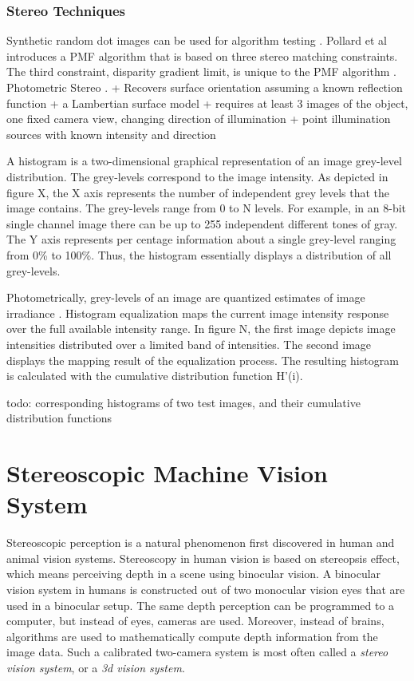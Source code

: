 \documentclass[12pt,a4paper,oneside,pdftex]{report}
\begin{document}
{\subsection{Stereo Techniques}


Synthetic random dot images can be used for algorithm testing \cite{Zitnick00}.
Pollard et al introduces a PMF algorithm that is based on three stereo matching constraints. The third constraint, disparity gradient limit, is unique to the PMF algorithm \cite{Sonka07}.
Photometric Stereo \cite{Woodham80}.
    + Recovers surface orientation assuming a known reflection function
    + a Lambertian surface model
    + requires at least 3 images of the object, one fixed camera view, changing direction of illumination
    + point illumination sources with known intensity and direction



A histogram is a two-dimensional graphical representation of an image grey-level distribution. The grey-levels correspond to the image intensity. As depicted in figure X, the X axis represents the number of independent grey levels that the image contains. The grey-levels range from 0 to N levels. For example, in an 8-bit single channel image there can be up to 255 independent different tones of gray. The Y axis represents per centage information about a single grey-level ranging from 0\% to 100\%. Thus, the histogram essentially displays a distribution of all grey-levels.

Photometrically, grey-levels of an image are quantized estimates of image irradiance \cite{Sonka07}.
Histogram equalization maps the current image intensity response over the full available intensity range. In figure N, the first image depicts image intensities distributed over a limited band of intensities. The second image displays the mapping result of the equalization process. The resulting histogram is calculated with the cumulative distribution function H'(i).

todo: corresponding histograms of two test images, and their cumulative distribution functions

\chapter{Stereoscopic Machine Vision System}
\label{chapter:stereographic_machine_vision_system}
Stereoscopic perception is a natural phenomenon first discovered in human and animal vision systems. Stereoscopy in human vision is based on stereopsis effect, which means perceiving depth in a scene using binocular vision. A binocular vision system in humans is constructed out of two monocular vision eyes that are used in a binocular setup. The same depth perception can be programmed to a computer, but instead of eyes, cameras are used. Moreover, instead of brains, algorithms are used to mathematically compute depth information from the image data. Such a calibrated two-camera system is most often called a \emph{stereo vision system}, or a \emph{3d vision system}.

}
\end{document}
